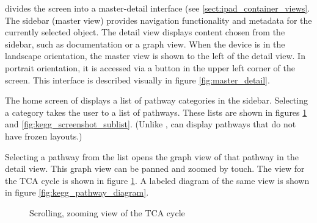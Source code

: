 \keggapp divides the screen into a master-detail interface (see
\ref{sect:ipad_container_views}. The sidebar (master view) provides navigation
functionality and metadata for the currently selected object. The detail view
displays content chosen from the sidebar, such as documentation or a graph view.
When the device is in the landscape orientation, the master view is shown to the
left of the detail view.  In portrait orientation, it is accessed via a button
in the upper left corner of the screen. This interface is described visually in
figure \ref{fig:master_detail}.

The home screen of \keggapp displays a list of pathway categories in the
sidebar. Selecting a category takes the user to a list of pathways. These lists
are shown in figures \ref{fig:kegg_screenshot_pathway} and
\ref{fig:kegg_screenshot_sublist}.  (Unlike \mawapp, \keggapp can
display pathways that do not have frozen layouts.)

Selecting a pathway from the list opens the graph view of that pathway in the
detail view. This graph view can be panned and zoomed by touch. The view for
the TCA cycle is shown in figure \ref{fig:kegg_screenshot_pathway}. A labeled
diagram of the same view is shown in figure \ref{fig:kegg_pathway_diagram}.

\begin{figure}[hbtp]
    \caption{\label{fig:kegg_screenshot_pathway} Scrolling, zooming view of
    the TCA cycle}
\end{figure}

